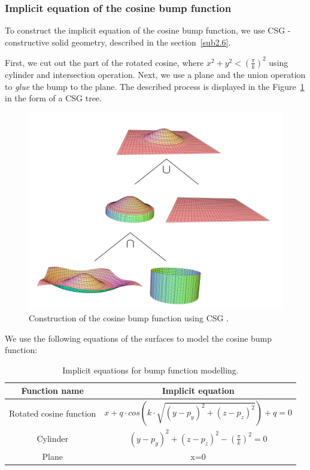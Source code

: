 \subsubsection*{Implicit equation of the cosine bump function}
To construct the implicit equation of the cosine bump function, we use CSG
- constructive solid geometry, described in the section~\ref{sub2.6}.

First, we cut out the part of the rotated cosine, where
$x^2+y^2<(\frac{\pi}{k})^2$ using cylinder and intersection operation. Next,
we use a plane and the union operation to \textit{glue} the bump to the plane.
The described process is displayed in the Figure~\ref{img:24} in the form of a CSG tree.
\begin{figure}
    \centerline{\includegraphics[scale=0.5]{images/img24}}
    \caption[Construction of the cosine bump function using CSG]
    {Construction of the cosine bump function using CSG \cite{calcplot3d}.}
    \label{img:24}
\end{figure}
We use the following equations of the surfaces to model the cosine bump function:

\begin{table}[]
    \centering
    \begin{tabular}{|c|c|}
        \hline\hline
    Function name            & Implicit equation                                        \\ \hline\hline
    Rotated cosine function & $x+q \cdot cos(k \cdot \sqrt{(y-p_y)^2+(z-p_z)^2})+q=0$  \\ \hline
    Cylinder                & $(y-p_y)^2+(z-p_z)^2-(\frac{\pi}{k})^2=0$                \\ \hline
    Plane                   & x=0                                                      \\ \hline\hline
    \end{tabular}
    \caption[Implicit equations for bump function modelling]
    {Implicit equations for bump function modelling.}
    \label{tab:1}
    \end{table}


